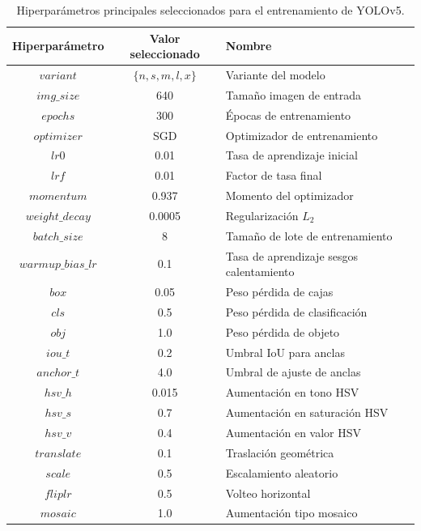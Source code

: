 \begin{table}[H]
    \centering
    \caption{Hiperparámetros principales seleccionados para el entrenamiento de YOLOv5.}
    \begin{tabular}{|c|c|l|}
        \hline
        \textbf{Hiperparámetro} & \textbf{Valor seleccionado} & \textbf{Nombre} \\
        \hline 
        $variant$ & $\{n,s,m,l,x \}$ & Variante del modelo \\
        \hline
        $img\_size$ & 640 & Tamaño imagen de entrada \\
        \hline
        $epochs$ & 300 & Épocas de entrenamiento \\
        \hline
        $optimizer$ & SGD & Optimizador de entrenamiento \\
        \hline
        $lr0$ & 0.01 & Tasa de aprendizaje inicial \\
        \hline
        $lrf$ & 0.01 & Factor de tasa final \\
        \hline
        $momentum$ & 0.937 & Momento del optimizador \\
        \hline
        $weight\_decay$ & 0.0005 & Regularización $L_2$ \\
        \hline
        $batch\_size$ & 8 & Tamaño de lote de entrenamiento \\
        \hline
        $warmup\_bias\_lr$ & 0.1 & Tasa de aprendizaje sesgos calentamiento \\
        \hline
        $box$ & 0.05 & Peso pérdida de cajas \\
        \hline
        $cls$ & 0.5 & Peso pérdida de clasificación \\
        \hline
        $obj$ & 1.0 & Peso pérdida de objeto \\
        \hline
        $iou\_t$ & 0.2 & Umbral IoU para anclas \\
        \hline
        $anchor\_t$ & 4.0 & Umbral de ajuste de anclas \\
        \hline
        $hsv\_h$ & 0.015 & Aumentación en tono HSV \\
        \hline
        $hsv\_s$ & 0.7 & Aumentación en saturación HSV \\
        \hline
        $hsv\_v$ & 0.4 & Aumentación en valor HSV \\
        \hline
        $translate$ & 0.1 & Traslación geométrica \\
        \hline
        $scale$ & 0.5 & Escalamiento aleatorio \\
        \hline
        $fliplr$ & 0.5 & Volteo horizontal \\
        \hline
        $mosaic$ & 1.0 & Aumentación tipo mosaico \\
        \hline
    \end{tabular}
    \label{tab:6.1-hiperparametros-yolov5}
\end{table}

